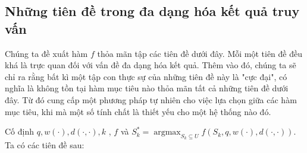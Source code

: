 \documentclass[12pt]{report}
\DeclareMathOperator*{\argmax}{argmax}
\begin{document}
\subsection{Những tiên đề trong đa dạng hóa kết quả truy vấn}
Chúng ta đề xuất hàm $f$ thỏa mãn tập các tiên đề dưới đây. Mỗi một tiên đề
đều khá là trực quan đối với  vấn đề đa dạng hóa kết quả. 
Thêm vào đó, chúng ta sẽ chỉ ra rằng bất kì một tập con thực sự của những tiên đề này là "cực đại", có nghĩa là không tồn tại hàm mục tiêu nào thỏa mãn tất cả những tiên đề dưới đây. 
Từ đó cung cấp một phương pháp tự nhiên cho việc lựa chọn 
giữa các hàm mục tiêu, khi mà 
một số tính chất là thiết yếu cho một hệ thống nào đó. 

Cố định $q, w(\cdot), d(\cdot, \cdot), k$ , $f$ và  
$S^*_k = \argmax_{S_k \subseteq U}
f(S_k, q, w(\cdot), d(\cdot, \cdot)) $. Ta có các tiên đề sau: 
\end{document}
